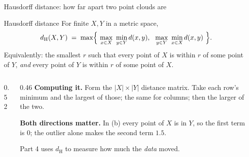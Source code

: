 \documentclass[10pt,aspectratio=169]{beamer}
\newcommand{\dH}{d_{\mathrm{H}}}
\begin{document}
    \begin{frame}[shrink=10]{Hausdorff distance: how far apart two point clouds are}
        \begin{block}{Hausdorff distance}
            For finite $X,Y$ in a metric space,
            \[
                \dH(X,Y)\;=\;\max\Bigl\{\ \max_{x\in X}\ \min_{y\in Y} d(x,y),\ \
                \max_{y\in Y}\ \min_{x\in X} d(x,y)\ \Bigr\}.
            \]
            Equivalently: the smallest $r$ such that every point of $X$ is within $r$ of
            some point of $Y$, \emph{and} every point of $Y$ is within $r$ of some point
            of $X$.
        \end{block}
        \begin{columns}[T,onlytextwidth]
            \begin{column}{0.52\textwidth}
                \centering
            \end{column}
            \begin{column}{0.46\textwidth}
                \small
                \textbf{Computing it.} Form the $|X|\times|Y|$ distance matrix. Take each
                row's minimum and the largest of those; the same for columns; then the
                larger of the two.

                \vspace{0.3em}
                \textbf{Both directions matter.} In (b) every point of $X$ is in $Y$, so
                the first term is $0$; the outlier alone makes the second term $1.5$.

                \vspace{0.3em}
                Part 4 uses $\dH$ to measure how much the \emph{data} moved.
            \end{column}
        \end{columns}
    \end{frame}
\end{document}
